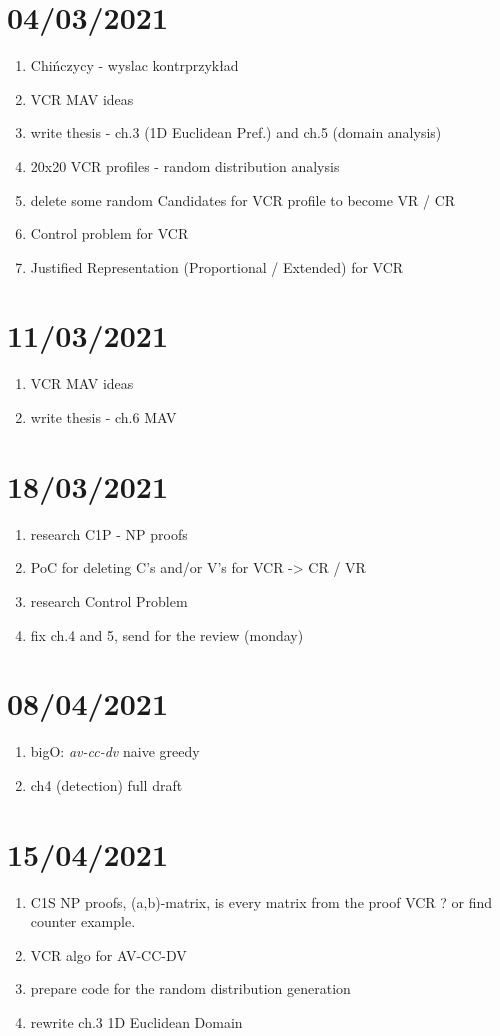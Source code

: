 \section{04/03/2021}
\begin{enumerate}
    \item Chińczycy - wyslac kontrprzykład
    \item VCR MAV ideas
    \item write thesis - ch.3 (1D Euclidean Pref.) and ch.5 (domain analysis)
    \item 20x20 VCR profiles - random distribution analysis
    \item delete some random Candidates for VCR profile to become VR / CR
    \item Control problem for VCR
    \item Justified Representation (Proportional / Extended) for VCR
\end{enumerate}

\section{11/03/2021}
\begin{enumerate}
    \item VCR MAV ideas
    \item write thesis - ch.6 MAV
\end{enumerate}

\section{18/03/2021}
\begin{enumerate}
    \item research C1P - NP proofs
    \item PoC for deleting C's and/or V's for VCR -> CR / VR
    \item research Control Problem
    \item fix ch.4 and 5, send for the review (monday)
\end{enumerate}

\section{08/04/2021}
\begin{enumerate}
    \item bigO: \textit{av-cc-dv} naive greedy
    \item ch4 (detection) full draft
\end{enumerate}


\section{15/04/2021}
\begin{enumerate}
    \item C1S NP proofs, (a,b)-matrix, is every matrix from the proof VCR ? or find counter example.
    \item VCR algo for AV-CC-DV
    \item prepare code for the random distribution generation
    \item rewrite ch.3 1D Euclidean Domain
\end{enumerate}
